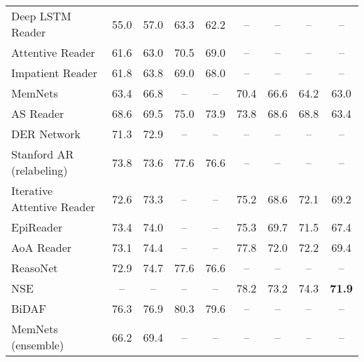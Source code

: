 \documentclass[11pt,a4paper]{article}
\begin{document}
\begin{table*}[ht]
\begin{tabular}{@{}l|cc|cc|cc|cc@{}}
Deep LSTM Reader  & 55.0 & 57.0 & 63.3 & 62.2 & -- & -- & -- & -- \\
Attentive Reader                       & 61.6                     & 63.0                      & 70.5                     & 69.0                      & --                     & --                      & --                     & --                     \\
Impatient Reader                       & 61.8                     & 63.8                      & 69.0                     & 68.0                      & --                     & --                      & --                     & --                     \\ 
MemNets                   & 63.4                     & 66.8                      & --                        & --                         & 70.4                  & 66.6                   & 64.2                  & 63.0                  \\
AS Reader               & 68.6                     & 69.5                      & 75.0                     & 73.9                      & 73.8                  & 68.6                   & 68.8                  & 63.4                  \\
DER Network                                    & 71.3                     & 72.9                      & --                        & --                         & --                     & --                      & --                     & --                     \\ 
Stanford AR (relabeling) 	& 	73.8	&	73.6	&	77.6	&	76.6	&	--	&	--	&	--	&	--	\\
Iterative Attentive Reader 	&	72.6	&	73.3	&	--	&	--	&	75.2	&	68.6	&	72.1	&	69.2 \\
EpiReader 	&	73.4	&	74.0	&	--	&	--	&	75.3	&	69.7	&	71.5	&	67.4 \\
AoA Reader  &	73.1	&	74.4	&	--	&	--	&	77.8	&	72.0	&	72.2	&	69.4	\\ 
ReasoNet  &	72.9	&	74.7	&	77.6	&	76.6	&	--	&	--	&	--	&	--	\\
NSE  &	--	&	--	&	--	&	--	&	78.2	&	73.2	&	74.3	&	\textbf{71.9} \\
BiDAF  &	76.3 & 76.9 & 80.3 & 79.6 &	--	&	--	&	--	&	--	\\ \midrule
MemNets (ensemble)                     & 66.2                     & 69.4                      & --                        & --                         & --                     & --                      & --                     & --                     \\ 

\end{tabular}
\end{table*}
\end{document}
